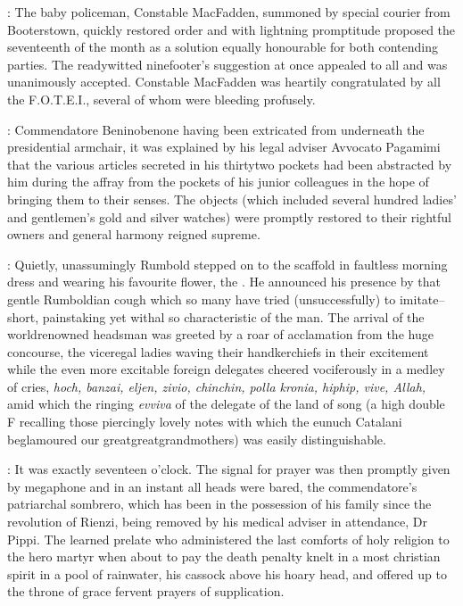 :
The baby policeman, Constable MacFadden, summoned by special courier from
Booterstown, quickly restored order and with lightning promptitude
proposed the seventeenth of the month
as a solution equally honourable for
both contending parties. The readywitted ninefooter's suggestion at once
appealed to all and was unanimously accepted. Constable MacFadden was
heartily congratulated by all the F.O.T.E.I., several of whom were
bleeding profusely.

:
Commendatore Beninobenone having been extricated
from underneath the presidential armchair, it was explained by his legal
adviser Avvocato Pagamimi that the various articles secreted in his
thirtytwo pockets had been abstracted by him during the affray from the
pockets of his junior colleagues in the hope of bringing them to their
senses. The objects (which included several hundred ladies' and
gentlemen's gold and silver watches)
were promptly restored to their
rightful owners and general harmony reigned supreme.

:
Quietly, unassumingly Rumbold stepped on to the scaffold in faultless
morning dress and wearing his favourite flower,
the .
He announced his presence by that gentle Rumboldian cough which so
many have tried (unsuccessfully) to imitate--short, painstaking yet withal
so characteristic of the man. The arrival of the worldrenowned headsman
was greeted by a roar of acclamation from the huge concourse, the
viceregal ladies waving their handkerchiefs in their excitement while the
even more excitable foreign delegates cheered vociferously in a medley of
cries, \emph{hoch, banzai, eljen, zivio,
chinchin, polla kronia, hiphip, vive,
Allah,} amid which the ringing \emph{evviva} of the delegate of the land of song
(a high double F recalling those piercingly lovely notes with which the
eunuch Catalani beglamoured our greatgreatgrandmothers) was easily
distinguishable.

:
It was exactly seventeen o'clock. The signal for prayer
was then promptly given by megaphone and in an instant all heads were
bared, the commendatore's patriarchal sombrero, which has been in the
possession of his family since the revolution of Rienzi, being removed by
his medical adviser in attendance, Dr Pippi. The learned prelate who
administered the last comforts of holy religion to the hero martyr when
about to pay the death penalty
knelt in a most christian spirit in a pool
of rainwater, his cassock above his hoary head, and offered up to the
throne of grace fervent prayers of supplication.

